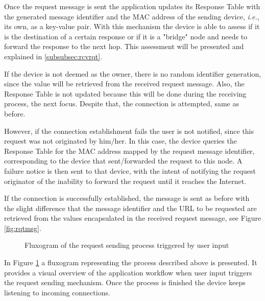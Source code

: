 Once the request message is sent the application updates its Response Table with the generated message identifier and the \gls{MAC} address of the sending device, \textit{i.e.}, its own, as a key-value pair. With this mechanism the device is able to assess if it is the destination of a certain response or if it is a "bridge" node and needs to forward the response to the next hop. This assessment will be presented and explained in \ref{subsubsec:rcvrqt}.

If the device is not deemed as the owner, there is no random identifier generation, since the value will be retrieved from the received request message. Also, the Response Table is not updated because this will be done during the receiving process, the next focus. Despite that, the connection is attempted, same as before.

However, if the connection establishment fails the user is not notified, since this request was not originated by him/her. In this case, the device queries the Response Table for the \gls{MAC} address mapped by the request message identifier, corresponding to the device that sent/forwarded the request to this node. A failure notice is then sent to that device, with the intent of notifying the request originator of the inability to forward the request until it reaches the Internet.

If the connection is successfully established, the message is sent as before with the slight difference that the message identifier and the \gls{URL} to be requested are retrieved from the values encapsulated in the received request message, see Figure \ref{fig:rqtmsg}.

\begin{figure}[ht]
   \noindent{}
	\caption{\label{fig:rqtflux} Fluxogram of the request sending process triggered by user input}
\end{figure}

In Figure \ref{fig:rqtflux} a fluxogram representing the process described above is presented. It provides a visual overview of the application workflow when user input triggers the request sending mechanism. Once the process is finished the device keeps listening to incoming connections.

